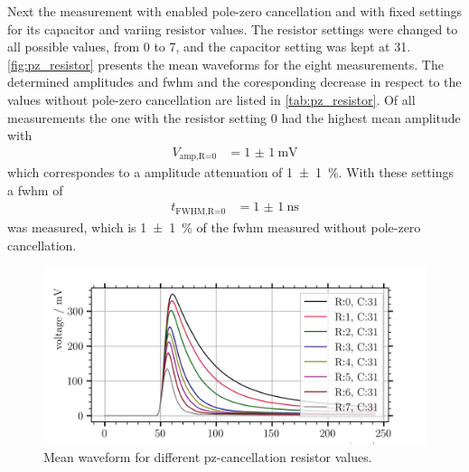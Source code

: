 Next the measurement with enabled pole-zero cancellation and with fixed settings for its capacitor and variing resistor values.
The resistor settings were changed to all possible values, from 0 to 7, and the capacitor setting was kept at 31.
\autoref{fig:pz_resistor} presents the mean waveforms for the eight measurements.
The determined amplitudes and \ac{fwhm} and the coresponding decrease in respect to the values without pole-zero cancellation are listed in \autoref{tab:pz_resistor}.
Of all measurements the one with the resistor setting 0 had the highest mean amplitude with 
\begin{align}
    V_\text{amp,R=0} &= \SI{1(1)}{\milli\volt}
\end{align}
which correspondes to a amplitude attenuation of \SI{1(1)}{\percent}.
With these settings a \ac{fwhm} of
\begin{align}
    t_\text{FWHM,R=0} &= \SI{1(1)}{\nano\second}
\end{align}
was measured, which is \SI{1(1)}{\percent} of the \ac{fwhm} measured without pole-zero cancellation.
\begin{figure}
	\centering
	\includegraphics[width=1.\textwidth]{pictures/pz_resistor.png}
	\caption[Mean waveform for different pz-cancellation resistor values.]{Mean waveform for different pz-cancellation resistor values.}
	\label{fig:pz_resistor}
\end{figure}

